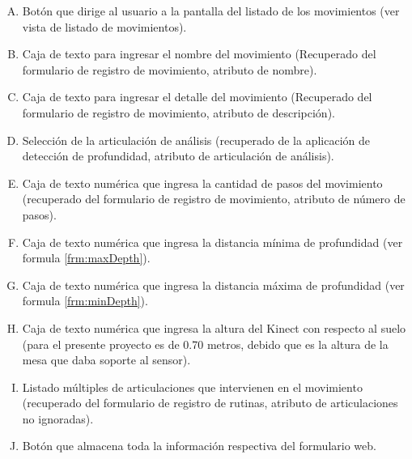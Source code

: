 \begin{enumerate}[A.]
\item Bot\'on que dirige al usuario a la pantalla del listado de los movimientos (ver vista de listado de movimientos).
\item Caja de texto para ingresar el nombre del movimiento (Recuperado del formulario de registro de movimiento, atributo de nombre).
\item Caja de texto para ingresar el detalle del movimiento (Recuperado del formulario de registro de movimiento, atributo de descripci\'on).
\item Selecci\'on de la articulaci\'on de an\'alisis (recuperado de la aplicaci\'on de detecci\'on de profundidad, atributo de articulaci\'on de an\'alisis).
\item Caja de texto num\'erica que ingresa la cantidad de pasos del movimiento (recuperado del formulario de registro de movimiento, atributo de n\'umero de pasos).
\item Caja de texto num\'erica que ingresa la distancia m\'inima de profundidad (ver formula \ref{frm:maxDepth}).
\item Caja de texto num\'erica que ingresa la distancia m\'axima de profundidad (ver formula \ref{frm:minDepth}).
\item Caja de texto num\'erica que ingresa la altura del Kinect con respecto al suelo (para el presente proyecto es de 0.70 metros, debido que es la altura de la mesa que daba soporte al sensor).
\item Listado m\'ultiples de articulaciones que intervienen en el movimiento (recuperado del formulario de registro de rutinas, atributo de articulaciones no ignoradas).
\item Bot\'on que almacena toda la informaci\'on respectiva del formulario web.
\end{enumerate}
